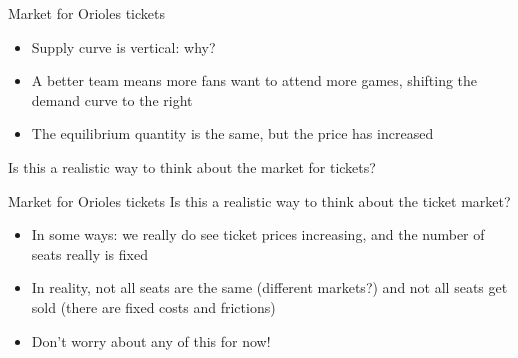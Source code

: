 \documentclass[aspectratio=169]{beamer}
\begin{document}
\begin{frame}{Market for Orioles tickets}
    \begin{itemize}
        \item Supply curve is vertical: why?
        \item A better team means more fans want to attend more games, shifting the demand curve to the right
        \item The equilibrium quantity is the same, but the price has increased
    \end{itemize}

    Is this a realistic way to think about the market for tickets?
\end{frame}

\begin{frame}{Market for Orioles tickets}
    Is this a realistic way to think about the ticket market?
    \begin{itemize}
        \item In some ways: we really do see ticket prices increasing, and the number of seats really is fixed
        \item In reality, not all seats are the same (different markets?) and not all seats get sold (there are fixed costs and frictions)
        \item Don't worry about any of this for now!
    \end{itemize}
\end{frame}
\end{document}
